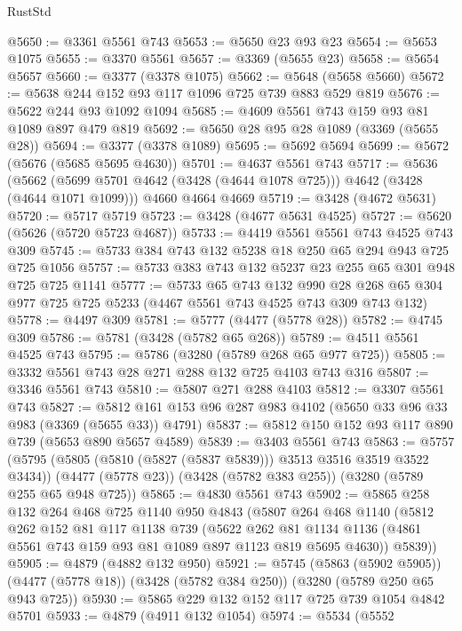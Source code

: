 \begin{lexlean}{RustStd}
\begin{coremodule}
@5650 := @3361 @5561 @743
@5653 := @5650 @23 @93 @23
@5654 := @5653 @1075
@5655 := @3370 @5561
@5657 := @3369 (@5655 @23)
@5658 := @5654 @5657
@5660 := @3377 (@3378 @1075)
@5662 := @5648 (@5658 @5660)
@5672 := @5638 @244 @152 @93 @117 @1096 @725 @739 @883 @529 @819
@5676 := @5622 @244 @93 @1092 @1094
@5685 := @4609 @5561 @743 @159 @93 @81 @1089 @897 @479 @819
@5692 := @5650 @28 @95 @28 @1089 (@3369 (@5655 @28))
@5694 := @3377 (@3378 @1089)
@5695 := @5692 @5694
@5699 := @5672 (@5676 (@5685 @5695 @4630))
@5701 := @4637 @5561 @743
@5717 := @5636
    (@5662 (@5699 @5701 @4642 (@3428 (@4644 @1078 @725))) @4642 (@3428 (@4644 @1071 @1099)))
    @4660
    @4664
    @4669
@5719 := @3428 (@4672 @5631)
@5720 := @5717 @5719
@5723 := @3428 (@4677 @5631 @4525)
@5727 := @5620 (@5626 (@5720 @5723 @4687))
@5733 := @4419 @5561 @5561 @743 @4525 @743 @309
@5745 := @5733 @384 @743 @132 @5238 @18 @250 @65 @294 @943 @725 @725 @1056
@5757 := @5733 @383 @743 @132 @5237 @23 @255 @65 @301 @948 @725 @725 @1141
@5777 := @5733
    @65
    @743
    @132
    @990
    @28
    @268
    @65
    @304
    @977
    @725
    @725
    @5233
    (@4467 @5561 @743 @4525 @743 @309 @743 @132)
@5778 := @4497 @309
@5781 := @5777 (@4477 (@5778 @28))
@5782 := @4745 @309
@5786 := @5781 (@3428 (@5782 @65 @268))
@5789 := @4511 @5561 @4525 @743
@5795 := @5786 (@3280 (@5789 @268 @65 @977 @725))
@5805 := @3332 @5561 @743 @28 @271 @288 @132 @725 @4103 @743 @316
@5807 := @3346 @5561 @743
@5810 := @5807 @271 @288 @4103
@5812 := @3307 @5561 @743
@5827 := @5812 @161 @153 @96 @287 @983 @4102 (@5650 @33 @96 @33 @983 (@3369 (@5655 @33)) @4791)
@5837 := @5812 @150 @152 @93 @117 @890 @739 (@5653 @890 @5657 @4589)
@5839 := @3403 @5561 @743
@5863 := @5757
    (@5795 (@5805 (@5810 (@5827 (@5837 @5839))) @3513 @3516 @3519 @3522 @3434))
    (@4477 (@5778 @23))
    (@3428 (@5782 @383 @255))
    (@3280 (@5789 @255 @65 @948 @725))
@5865 := @4830 @5561 @743
@5902 := @5865
    @258
    @132
    @264
    @468
    @725
    @1140
    @950
    @4843
    (@5807
      @264
      @468
      @1140
      (@5812
        @262
        @152
        @81
        @117
        @1138
        @739
        (@5622
          @262
          @81
          @1134
          @1136
          (@4861 @5561 @743 @159 @93 @81 @1089 @897 @1123 @819 @5695 @4630))
        @5839))
@5905 := @4879 (@4882 @132 @950)
@5921 := @5745
    (@5863 (@5902 @5905))
    (@4477 (@5778 @18))
    (@3428 (@5782 @384 @250))
    (@3280 (@5789 @250 @65 @943 @725))
@5930 := @5865 @229 @132 @152 @117 @725 @739 @1054 @4842 @5701
@5933 := @4879 (@4911 @132 @1054)
@5974 := @5534
    (@5552

\end{coremodule}
\end{lexlean}
